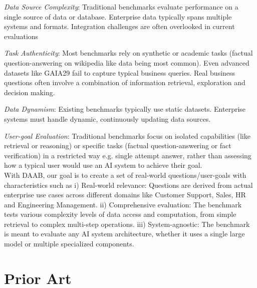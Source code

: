 \documentclass[11pt,a4paper]{article}
\begin{document}
\textit{Data Source Complexity}: Traditional benchmarks evaluate performance on a single source of data or database. Enterprise data typically spans multiple systems and formats. Integration challenges are often overlooked in current evaluations 

\textit{Task Authenticity}: Most benchmarks rely on synthetic or academic tasks (factual question-answering on wikipedia like data being most common). Even advanced datasets like GAIA29 fail to capture typical business queries. Real business questions often involve a combination of information retrieval, exploration and decision making.

\textit{Data Dynamism}: Existing benchmarks typically use static datasets. Enterprise systems must handle dynamic, continuously updating data sources.

\textit{User-goal Evaluation}: Traditional benchmarks focus on isolated capabilities (like retrieval or reasoning) or specific tasks (factual question-answering or fact verification) in a restricted way e.g. single attempt answer, rather than assessing how a typical user would use an AI system to achieve their goal. \\

With DAAB, our goal is to create a set of real-world questions/user-goals with characteristics such as i) Real-world relevance: Questions are derived from actual enterprise use cases across different domains like Customer Support, Sales, HR and Engineering Management. ii) Comprehensive evaluation: The benchmark tests various complexity levels of data access and computation, from simple retrieval to complex multi-step operations. iii) System-agnostic: The benchmark is meant to evaluate any AI system architecture, whether it uses a single large model or multiple specialized components.

\section{Prior Art}
\end{document}
